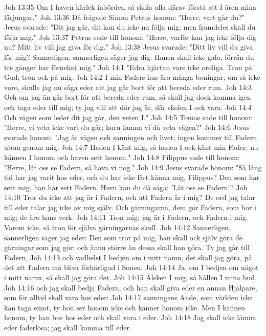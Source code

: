 Joh 13:35  Om I haven kärlek inbördes, så skola alla därav förstå att I ären mina lärjungar."
Joh 13:36  Då frågade Simon Petrus honom: "Herre, vart går du?" Jesus svarade: "Dit jag går, dit kan du icke nu följa mig; men framdeles skall du följa mig."
Joh 13:37  Petrus sade till honom: "Herre, varför kan jag icke följa dig nu? Mitt liv vill jag giva för dig."
Joh 13:38  Jesus svarade: "Ditt liv vill du giva för mig? Sannerligen, sannerligen säger jag dig: Hanen skall icke gala, förrän du tre gånger har förnekat mig."
Joh 14:1  "Edra hjärtan vare icke oroliga. Tron på Gud; tron ock på mig.
Joh 14:2  I min Faders hus äro många boningar; om så icke voro, skulle jag nu säga eder att jag går bort för att bereda eder rum.
Joh 14:3  Och om jag än går bort för att bereda eder rum, så skall jag dock komma igen och taga eder till mig; ty jag vill att där jag är, där skolen I ock vara.
Joh 14:4  Och vägen som leder dit jag går, den veten I."
Joh 14:5  Tomas sade till honom: "Herre, vi veta icke vart du går; huru kunna vi då veta vägen?"
Joh 14:6  Jesus svarade honom: "Jag är vägen och sanningen och livet; ingen kommer till Fadern utom genom mig.
Joh 14:7  Haden I känt mig, så haden I ock känt min Fader; nu kännen I honom och haven sett honom."
Joh 14:8  Filippus sade till honom: "Herre, låt oss se Fadern, så hava vi nog."
Joh 14:9  Jesus svarade honom: "Så lång tid har jag varit hos eder, och du har icke lärt känna mig, Filippus? Den som har sett mig, han har sett Fadern. Huru kan du då säga: 'Låt oss se Fadern'?
Joh 14:10  Tror du icke att jag är i Fadern, och att Fadern är i mig? De ord jag talar till eder talar jag icke av mig själv. Och gärningarna, dem gör Fadern, som bor i mig; de äro hans verk.
Joh 14:11  Tron mig; jag är i Fadern, och Fadern i mig. Varom icke, så tron för själva gärningarnas skull.
Joh 14:12  Sannerligen, sannerligen säger jag eder: Den som tror på mig, han skall ock själv göra de gärningar som jag gör; och ännu större än dessa skall han göra. Ty jag går till Fadern,
Joh 14:13  och vadhelst I bedjen om i mitt namn, det skall jag göra, på det att Fadern må bliva förhärligad i Sonen.
Joh 14:14  Ja, om I bedjen om något i mitt namn, så skall jag göra det.
Joh 14:15  Älsken I mig, så hållen I mina bud,
Joh 14:16  och jag skall bedja Fadern, och han skall giva eder en annan Hjälpare, som för alltid skall vara hos eder:
Joh 14:17  sanningens Ande, som världen icke kan taga emot, ty hon ser honom icke och känner honom icke. Men I kännen honom, ty han bor hos eder och skall vara i eder.
Joh 14:18  Jag skall icke lämna eder faderlösa; jag skall komma till eder.
